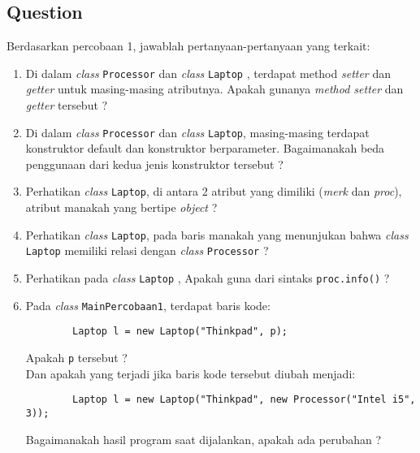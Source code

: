 \documentclass[12pt,titlepage]{article}
\begin{document}
\newpage
\subsection{Question}
Berdasarkan percobaan 1, jawablah pertanyaan-pertanyaan yang terkait:
\begin{enumerate}
    \item Di dalam \textit{class} \texttt{Processor} dan \textit{class} \texttt{Laptop} , terdapat method \textit{setter} dan \textit{getter} untuk masing-masing atributnya. Apakah gunanya \textit{method setter} dan \textit{getter} tersebut ?
    \item Di dalam \textit{class} \texttt{Processor} dan \textit{class} \texttt{Laptop}, masing-masing terdapat konstruktor default dan konstruktor berparameter. Bagaimanakah beda penggunaan dari kedua jenis konstruktor tersebut ?
    \item Perhatikan \textit{class} \texttt{Laptop}, di antara 2 atribut yang dimiliki (\textit{merk} dan \textit{proc}), atribut manakah yang bertipe \textit{object} ?
    \item Perhatikan \textit{class} \texttt{Laptop}, pada baris manakah yang menunjukan bahwa \textit{class} \texttt{Laptop} memiliki relasi dengan \textit{class} \texttt{Processor} ?
    \item Perhatikan pada \textit{class} \texttt{Laptop} , Apakah guna dari sintaks \texttt{proc.info()} ?
    \item Pada \textit{class} \texttt{MainPercobaan1}, terdapat baris kode:
    \begin{verbatim}
        Laptop l = new Laptop("Thinkpad", p);
    \end{verbatim}
    Apakah \texttt{p} tersebut ?\\
    Dan apakah yang terjadi jika baris kode tersebut diubah menjadi:
    \begin{verbatim}
        Laptop l = new Laptop("Thinkpad", new Processor("Intel i5", 3));
    \end{verbatim}
    Bagaimanakah hasil program saat dijalankan, apakah ada perubahan ?
\end{enumerate}

\newpage
\end{document}
